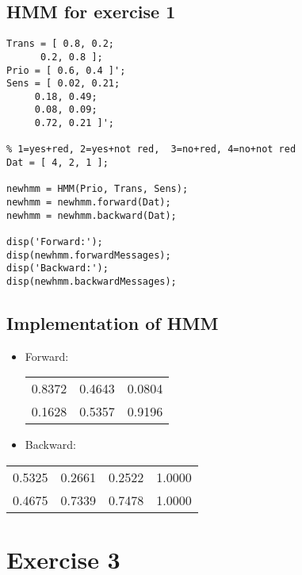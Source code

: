 \documentclass[colorlinks=true,linkcolor=blue]{article}
\begin{document}
\subsection{HMM for exercise 1}
\label{sec-2-2}
\begin{verbatim}
Trans = [ 0.8, 0.2; 
	  0.2, 0.8 ];
Prio = [ 0.6, 0.4 ]';
Sens = [ 0.02, 0.21; 
	 0.18, 0.49; 
	 0.08, 0.09; 
	 0.72, 0.21 ]';

% 1=yes+red, 2=yes+not red,  3=no+red, 4=no+not red
Dat = [ 4, 2, 1 ];

newhmm = HMM(Prio, Trans, Sens);
newhmm = newhmm.forward(Dat);
newhmm = newhmm.backward(Dat);

disp('Forward:');
disp(newhmm.forwardMessages);
disp('Backward:');
disp(newhmm.backwardMessages);
\end{verbatim}

\subsection{Implementation of HMM}
\label{sec-2-3}
\begin{itemize}
\item Forward:
\begin{center}
\begin{tabular}{rrr}
0.8372 & 0.4643 & 0.0804\\
0.1628 & 0.5357 & 0.9196\\
\end{tabular}
\end{center}

\item Backward:
\end{itemize}
\begin{center}
\begin{tabular}{rrrr}
0.5325 & 0.2661 & 0.2522 & 1.0000\\
0.4675 & 0.7339 & 0.7478 & 1.0000\\
\end{tabular}
\end{center}
\section{Exercise 3}
\label{sec-3}
\end{document}
